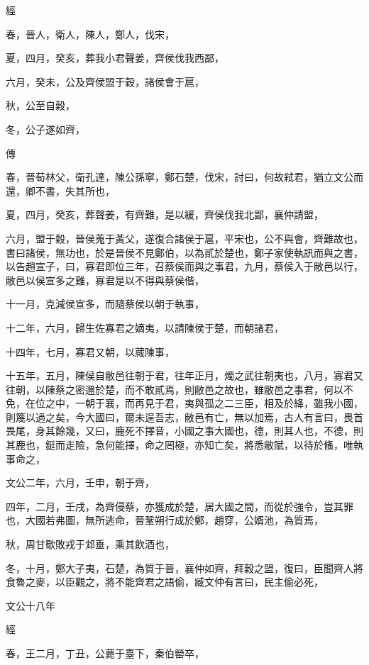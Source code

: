 \documentclass[fontset = none]{ctexart}
\begin{document}
經



春，晉人，衛人，陳人，鄭人，伐宋，

夏，四月，癸亥，葬我小君聲姜，齊侯伐我西鄙，

六月，癸未，公及齊侯盟于穀，諸侯會于扈，

秋，公至自穀，

冬，公子遂如齊，

傳



春，晉荀林父，衛孔達，陳公孫寧，鄭石楚，伐宋，討曰，何故弒君，猶立文公而還，卿不書，失其所也，

夏，四月，癸亥，葬聲姜，有齊難，是以緩，齊侯伐我北鄙，襄仲請盟，

六月，盟于穀，晉侯蒐于黃父，遂復合諸侯于扈，平宋也，公不與會，齊難故也，書曰諸侯，無功也，於是晉侯不見鄭伯，以為貳於楚也，鄭子家使執訊而與之書，以告趙宣子，曰，寡君即位三年，召蔡侯而與之事君，九月，蔡侯入于敝邑以行，敝邑以侯宣多之難，寡君是以不得與蔡侯偕，

十一月，克減侯宣多，而隨蔡侯以朝于執事，

十二年，六月，歸生佐寡君之嫡夷，以請陳侯于楚，而朝諸君，

十四年，七月，寡君又朝，以蕆陳事，

十五年，五月，陳侯自敝邑往朝于君，往年正月，燭之武往朝夷也，八月，寡君又往朝，以陳蔡之密邇於楚，而不敢貳焉，則敝邑之故也，雖敝邑之事君，何以不免，在位之中，一朝于襄，而再見于君，夷與孤之二三臣，相及於絳，雖我小國，則篾以過之矣，今大國曰，爾未逞吾志，敝邑有亡，無以加焉，古人有言曰，畏首畏尾，身其餘幾，又曰，鹿死不擇音，小國之事大國也，德，則其人也，不德，則其鹿也，鋌而走險，急何能擇，命之罔極，亦知亡矣，將悉敝賦，以待於鯈，唯執事命之，

文公二年，六月，壬申，朝于齊，

四年，二月，壬戌，為齊侵蔡，亦獲成於楚，居大國之間，而從於強令，豈其罪也，大國若弗圖，無所逃命，晉鞏朔行成於鄭，趙穿，公婿池，為質焉，

秋，周甘歜敗戎于邥垂，乘其飲酒也，

冬，十月，鄭大子夷，石楚，為質于晉，襄仲如齊，拜穀之盟，復曰，臣聞齊人將食魯之麥，以臣觀之，將不能齊君之語偷，臧文仲有言曰，民主偷必死，





文公十八年


經



春，王二月，丁丑，公薨于臺下，秦伯罃卒，
\end{document}
